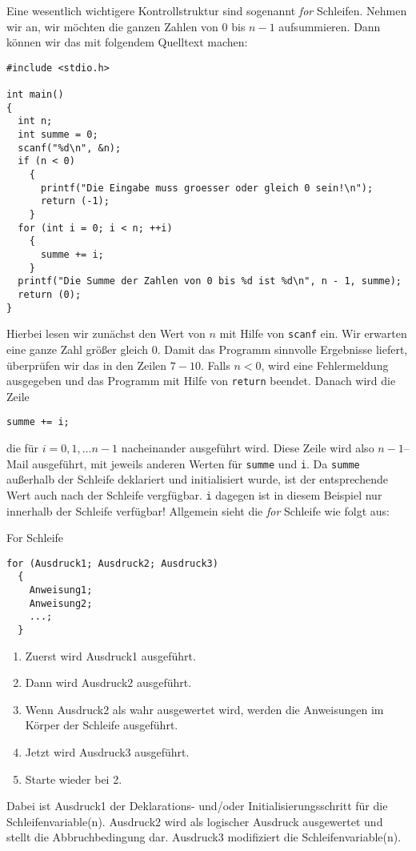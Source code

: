 Eine wesentlich wichtigere Kontrollstruktur sind sogenannt \emph{for} Schleifen.
Nehmen wir an, wir möchten die ganzen Zahlen von $0$ bis $n-1$ aufsummieren.
Dann können wir das mit folgendem Quelltext machen:
\begin{lstlisting}
#include <stdio.h>

int main()
{
  int n;
  int summe = 0;
  scanf("%d\n", &n);
  if (n < 0)
    {
      printf("Die Eingabe muss groesser oder gleich 0 sein!\n");
      return (-1);
    }
  for (int i = 0; i < n; ++i)
    {
      summe += i;
    }
  printf("Die Summe der Zahlen von 0 bis %d ist %d\n", n - 1, summe);
  return (0);
}
\end{lstlisting}
Hierbei lesen wir zunächst den Wert von $n$ mit Hilfe von \verb|scanf| ein.
Wir erwarten eine ganze Zahl größer gleich $0$.
Damit das Programm sinnvolle Ergebnisse liefert, überprüfen wir das in den Zeilen $7-10$.
Falls $n<0$, wird eine Fehlermeldung ausgegeben und das Programm mit Hilfe von \verb|return| beendet.
Danach wird die Zeile 
\begin{lstlisting}
summe += i;
\end{lstlisting}
die für $i=0,1,\ldots n-1$ nacheinander ausgeführt wird.
Diese Zeile wird also $n-1$--Mail ausgeführt, mit jeweils anderen Werten für \verb|summe| und \verb|i|.
Da \verb|summe| außerhalb der Schleife deklariert und initialisiert wurde, ist der entsprechende Wert auch nach der Schleife vergfügbar.
\verb|i| dagegen ist in diesem Beispiel nur innerhalb der Schleife verfügbar!
Allgemein sieht die \emph{for} Schleife wie folgt aus:
\begin{myalertblock}{For Schleife}
\begin{lstlisting}
for (Ausdruck1; Ausdruck2; Ausdruck3)
  {
    Anweisung1;
    Anweisung2;
    ...;
  }
\end{lstlisting}
\vspace{-1cm}
\begin{enumerate}
\item Zuerst wird Ausdruck1 ausgeführt.
\item Dann wird Ausdruck2 ausgeführt.
\item Wenn Ausdruck2 als wahr ausgewertet wird, werden die Anweisungen im Körper der Schleife ausgeführt.
\item Jetzt wird Ausdruck3 ausgeführt.
\item Starte wieder bei 2.
\end{enumerate}
\end{myalertblock}
Dabei ist Ausdruck1 der Deklarations- und/oder Initialisierungsschritt für die Schleifenvariable(n).
Ausdruck2 wird als logischer Ausdruck ausgewertet und stellt die Abbruchbedingung dar.
Ausdruck3 modifiziert die Schleifenvariable(n).

